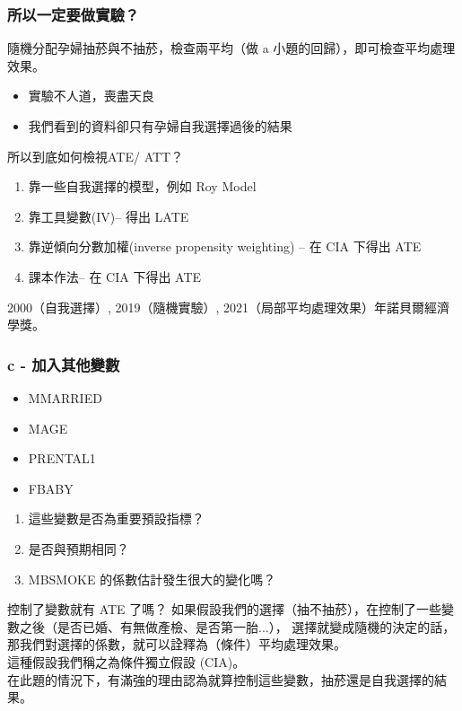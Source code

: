 \begin{frame}
    \frametitle{所以一定要做實驗？}

    隨機分配孕婦抽菸與不抽菸，檢查兩平均（做 a 小題的回歸），即可檢查平均處理效果。

    \begin{itemize}
        \item 實驗不人道，喪盡天良
        \item 我們看到的資料卻只有孕婦自我選擇過後的結果
    \end{itemize}
    
    所以到底如何檢視ATE/ ATT？
    \begin{enumerate}
        \item 靠一些自我選擇的模型，例如 Roy Model
        \item 靠工具變數(IV)-- 得出 LATE 
        \item 靠逆傾向分數加權(inverse propensity weighting) -- 在 CIA 下得出 ATE
        \item 課本作法-- 在 CIA 下得出 ATE
    \end{enumerate}

    2000（自我選擇）, 2019（隨機實驗）, 2021（局部平均處理效果）年諾貝爾經濟學獎。
\end{frame}

\begin{frame}
    \frametitle{ c - 加入其他變數}
    \begin{itemize}
        \item MMARRIED
        \item MAGE
        \item PRENTAL1
        \item FBABY
    \end{itemize}

    \begin{enumerate}
        \item 這些變數是否為重要預設指標？
        \item 是否與預期相同？
        \item MBSMOKE 的係數估計發生很大的變化嗎？
    \end{enumerate}

\end{frame}

\begin{frame}[plain]
    \begin{alertblock}{控制了變數就有 ATE 了嗎？}
        如果假設我們的選擇（抽不抽菸），在控制了一些變數之後（是否已婚、有無做產檢、是否第一胎...），
        選擇就變成隨機的決定的話，那我們對選擇的係數，就可以詮釋為（條件）平均處理效果。\\
        [2em]
        這種假設我們稱之為條件獨立假設 (CIA)。\\
        [2em]
        在此題的情況下，有滿強的理由認為就算控制這些變數，抽菸還是自我選擇的結果。
    \end{alertblock}    
\end{frame}

